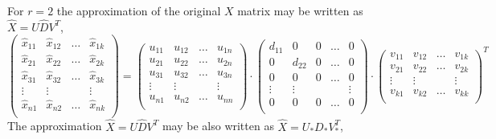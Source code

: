\documentclass[12pt]{article}
\begin{document}
For $r = 2$ the approximation of the original $X$ matrix may be written as $\hat X = U \hat D V^T$,
\[
\begin{pmatrix}
    \hat x_{11} & \hat x_{12} & \dots & \hat x_{1k} \\
    \hat x_{21} & \hat x_{22} & \dots & \hat x_{2k} \\
    \hat x_{31} & \hat x_{32} & \dots & \hat x_{3k} \\
    \vdots & \vdots &    & \vdots \\
    \hat x_{n1} & \hat x_{n2} & \dots & \hat x_{nk} \\
\end{pmatrix} =
\begin{pmatrix}
    u_{11} & u_{12} & \dots & u_{1n} \\
    u_{21} & u_{22} & \dots & u_{2n} \\
    u_{31} & u_{32} & \dots & u_{3n} \\
    \vdots & \vdots &    & \vdots \\
    u_{n1} & u_{n2} & \dots & u_{nn} \\
\end{pmatrix} \cdot 
\begin{pmatrix}
    d_{11} & 0 & 0 & \dots  & 0 \\
    0 & d_{22} & 0 & \dots  & 0 \\
    0 & 0 &  0 & \dots  & 0 \\
    \vdots & \vdots &  &  & \vdots \\
    0 & 0 & 0 & \dots  & 0 \\
\end{pmatrix} \cdot
\begin{pmatrix}
    v_{11} & v_{12} & \dots & v_{1k} \\
    v_{21} & v_{22} & \dots & v_{2k} \\
    \vdots & \vdots &    & \vdots \\
    v_{k1} & v_{k2} & \dots & v_{kk} \\
\end{pmatrix}^T
\]
The approximation $\hat X = U\hat D V^T$ may be also written as $\hat X = U_* D_* V_*^T$,
\end{document}
